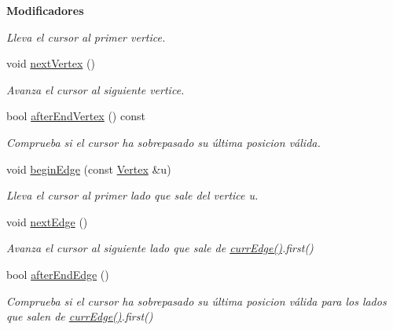 \begin{Indent}{\bf Modificadores}
\begin{DoxyCompactItemize}
\begin{DoxyCompactList}\small\item\em Lleva el cursor al primer vertice. \end{DoxyCompactList}\item 
\hypertarget{classedi_1_1GraphMatrix_ae6ab61d54402354a83ab6970c7d20cbc}{}void \hyperlink{classedi_1_1GraphMatrix_ae6ab61d54402354a83ab6970c7d20cbc}{next\+Vertex} ()\label{classedi_1_1GraphMatrix_ae6ab61d54402354a83ab6970c7d20cbc}

\begin{DoxyCompactList}\small\item\em Avanza el cursor al siguiente vertice. \end{DoxyCompactList}\item 
bool \hyperlink{classedi_1_1GraphMatrix_a7213b5217b83ac1242fd77529b2d05e8}{after\+End\+Vertex} () const 
\begin{DoxyCompactList}\small\item\em Comprueba si el cursor ha sobrepasado su última posicion válida. \end{DoxyCompactList}\item 
void \hyperlink{classedi_1_1GraphMatrix_a2073d7dbe56bb4ddd3024592ff60d112}{begin\+Edge} (const \hyperlink{classedi_1_1Vertex}{Vertex} \&u)
\begin{DoxyCompactList}\small\item\em Lleva el cursor al primer lado que sale del vertice u. \end{DoxyCompactList}\item 
\hypertarget{classedi_1_1GraphMatrix_a6e6968308b41f13c3754252637a04a86}{}void \hyperlink{classedi_1_1GraphMatrix_a6e6968308b41f13c3754252637a04a86}{next\+Edge} ()\label{classedi_1_1GraphMatrix_a6e6968308b41f13c3754252637a04a86}

\begin{DoxyCompactList}\small\item\em Avanza el cursor al siguiente lado que sale de \hyperlink{classedi_1_1GraphMatrix_ada0a9c50e87493338527baab50600501}{curr\+Edge()}.first() \end{DoxyCompactList}\item 
bool \hyperlink{classedi_1_1GraphMatrix_a5d8d1a51905b161794002f7947475227}{after\+End\+Edge} ()
\begin{DoxyCompactList}\small\item\em Comprueba si el cursor ha sobrepasado su última posicion válida para los lados que salen de \hyperlink{classedi_1_1GraphMatrix_ada0a9c50e87493338527baab50600501}{curr\+Edge()}.first() \end{DoxyCompactList}\end{DoxyCompactItemize}
\end{Indent}


